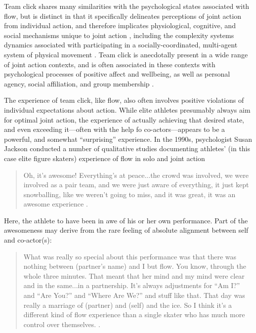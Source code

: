 \begin{CJK}{UTF8}{gbsn}
  Team click shares many similarities with the psychological states associated with flow, but is distinct in that it specifically delineates perceptions of joint action from individual action, and therefore implicates physiological, cognitive, and social mechanisms unique to joint action \citep{Vesper2010}, including the complexity systems dynamics associated with participating in a socially-coordinated, multi-agent system of physical movement \citep{Kelso2009}.  Team click is anecdotally present in a wide range of joint action contexts, and is often associated in these contexts with psychological processes of positive affect and wellbeing, as well as personal agency, social affiliation, and group membership \citep{Jackson1995,Marsh2009,Wheatley2012,Slingerland2014}.


  The experience of team click, like flow, also often involves positive violations of individual expectations about action.  While elite athletes presumably always aim for optimal joint action, the experience of actually achieving that desired state, and even exceeding it---often with the help fo co-actors---appears to be a powerful, and somewhat ``surprising'' experience.  In the 1990s, psychologist Susan Jackson conducted a number of qualitative studies documenting athletes' (in this case elite figure skaters) experience of flow in solo and joint action

    \begin{quote}
      Oh, it's awesome! Everything's at peace...the crowd was involved, we were involved as a pair team, and we were just aware of everything, it just kept snowballing, like we weren’t going to miss, and it was great, it was an awesome experience \citep[168]{Jackson1992}.
    \end{quote}

Here, the athlete to have been in awe of his or her own performance.  Part of the awesomeness may derive from the rare feeling of absolute alignment between self and co-actor(s):

    \begin{quote}
      What was really so special about this performance was that there was nothing between (partner's name) and I but flow.  You know, through the whole three minutes.  That meant that her mind and my mind were clear and in the same...in a partnership. It's always adjustments for ``Am I?'' and ``Are You?'' and ``Where Are We?'' and stuff like that.  That day was really a marriage of (partner) and (self) and the ice.  So I think it's a different kind of flow experience than a single skater who has much more control over themselves. \citep[173-4]{Jackson1992}.
    \end{quote}


\end{CJK}

